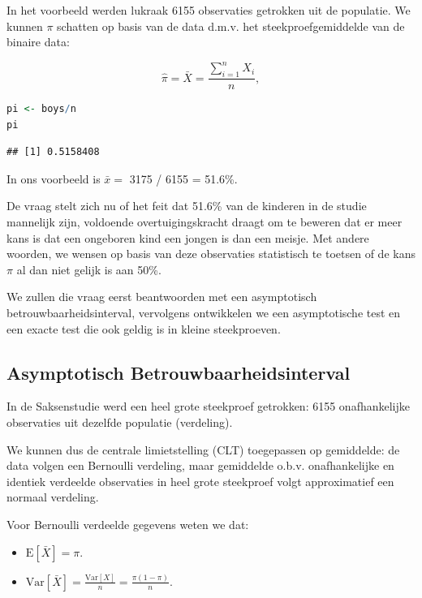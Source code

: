 \documentclass[
  12pt,dutch,coursenotes]{book}
\providecommand{\tightlist}{%
  \setlength{\itemsep}{0pt}\setlength{\parskip}{0pt}}
\theoremstyle{definition}
\theoremstyle{definition}
\theoremstyle{definition}
\theoremstyle{definition}
\theoremstyle{remark}
\begin{document}
In het voorbeeld werden lukraak
6155 observaties getrokken uit de populatie.
We kunnen \(\pi\) schatten op basis van de data d.m.v. het steekproefgemiddelde van de binaire data:

\[\hat \pi = \bar X = \frac{\sum\limits_{i=1}^n X_i}{n},\]

\begin{lstlisting}[language=R]
pi <- boys/n
pi
\end{lstlisting}

\begin{lstlisting}
## [1] 0.5158408
\end{lstlisting}

In ons voorbeeld is \(\bar x =\) 3175 / 6155 = 51.6\%.

De vraag stelt zich nu of het feit dat 51.6\% van de kinderen in de studie mannelijk zijn, voldoende overtuigingskracht draagt om te beweren dat er meer kans is dat een ongeboren kind een jongen is dan een meisje. Met andere woorden, we wensen op basis van deze observaties statistisch te toetsen of de kans \(\pi\) al dan niet gelijk is aan 50\%.

We zullen die vraag eerst beantwoorden met een asymptotisch betrouwbaarheidsinterval, vervolgens ontwikkelen we een asymptotische test en een exacte test die ook geldig is in kleine steekproeven.

\hypertarget{asymptotisch-betrouwbaarheidsinterval}{%
\subsection{Asymptotisch Betrouwbaarheidsinterval}\label{asymptotisch-betrouwbaarheidsinterval}}

In de Saksenstudie werd een heel grote steekproef getrokken: 6155 onafhankelijke observaties uit dezelfde populatie (verdeling).

We kunnen dus de centrale limietstelling (CLT) toegepassen op gemiddelde:
de data volgen een Bernoulli verdeling, maar gemiddelde o.b.v. onafhankelijke en identiek verdeelde observaties in heel grote steekproef volgt approximatief een normaal verdeling.

Voor Bernoulli verdeelde gegevens weten we dat:

\begin{itemize}
\tightlist
\item
  \(\text{E}[\bar X] = \pi\).
\item
  \(\text{Var}[\bar X] = \frac{\text{Var}[X]}{n} = \frac{\pi(1-\pi)}{n}\).
\end{itemize}
\end{document}
